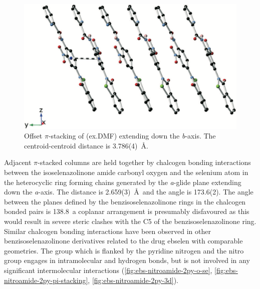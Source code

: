 \begin{refsection}
\begin{figure}
    \centering
    \includegraphics[width=0.8\linewidth]{Figures/ebs-nitroamide-2py-packing.pdf}
    \caption[Offset $\pi$-stacking of (ex.DMF) extending down the \emph{b}-axis.]{Offset $\pi$-stacking of (ex.DMF) extending down the \emph{b}-axis. The centroid-centroid distance is 3.786(4)~\AA.}
    \label{fig:ebs-nitroamide-2py-packing}
\end{figure}

Adjacent $\pi$-stacked columns are held together by chalcogen bonding interactions between the isoselenazolinone amide carbonyl oxygen and the selenium atom in the heterocyclic ring forming chains generated by the \emph{a}-glide plane extending down the \emph{a}-axis.
The  distance is 2.659(3)~\AA~and the  angle is 173.6(2)\degree.
The angle between the planes defined by the benzisoselenazolinone rings in the chalcogen bonded pairs is 138.8\degree~a coplanar arrangement is presumably disfavoured as this would result in severe steric clashes with the C5 of the benzisoselenazolinone ring.
Similar  chalcogen bonding interactions have been observed in other benzisoselenazolinone derivatives related to the drug ebselen with comparable geometries.\autocite{Fellowes2019,Thomas2015,Bhabak2007,Piatek1995}
The  group which is flanked by the pyridine nitrogen and the nitro group engages in intramolecular  and  hydrogen bonds, but is not involved in any significant intermolecular interactions (\cref{fig:ebs-nitroamide-2py-o-se}, \cref{fig:ebs-nitroamide-2py-pi-stacking}, \cref{fig:ebs-nitroamide-2py-3d}).


\end{refsection}
